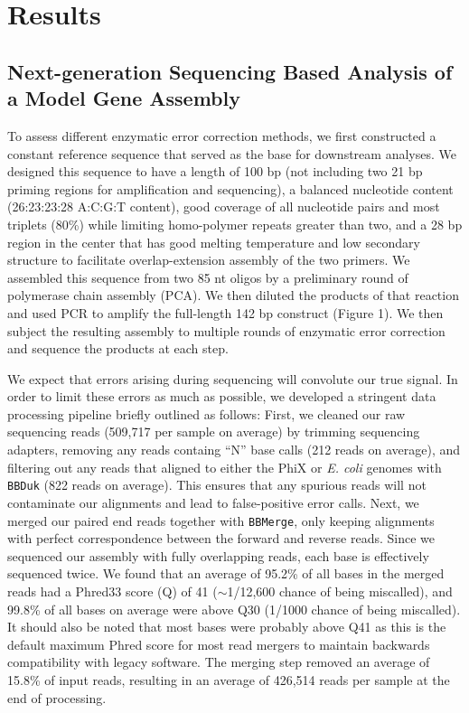 \documentclass[twocolumn]{article}
\begin{document}
%
\section*{Results}
%

\subsection*{Next-generation Sequencing Based Analysis of a Model Gene Assembly}

To assess different enzymatic error correction methods, we first constructed a constant reference sequence that served as the base for downstream analyses. We designed this sequence to have a length of 100 bp (not including two 21 bp priming regions for amplification and sequencing), a balanced nucleotide content (26:23:23:28 A:C:G:T content), good coverage of all nucleotide pairs and most triplets (80\%) while limiting homo-polymer repeats greater than two, and a 28 bp region in the center that has good melting temperature and low secondary structure to facilitate overlap-extension assembly of the two primers. We assembled this sequence from two 85 nt oligos by a preliminary round of polymerase chain assembly (PCA). We then diluted the products of that reaction and used PCR to amplify the full-length 142 bp construct (Figure 1). We then subject the resulting assembly to multiple rounds of enzymatic error correction and sequence the products at each step.

We expect that errors arising during sequencing will convolute our true signal. In order to limit these errors as much as possible, we developed a stringent data processing pipeline briefly outlined as follows: First, we cleaned our raw sequencing reads (509,717 per sample on average) by trimming sequencing adapters, removing any reads containg ``N'' base calls (212 reads on average), and filtering out any reads that aligned to either the PhiX or \textit{E. coli} genomes with \texttt{BBDuk} (822 reads on average). This ensures that any spurious reads will not contaminate our alignments and lead to false-positive error calls. Next, we merged our paired end reads together with \texttt{BBMerge}, only keeping alignments with perfect correspondence between the forward and reverse reads. Since we sequenced our assembly with fully overlapping reads, each base is effectively sequenced twice. We found that an average of 95.2\% of all bases in the merged reads had a Phred33 score (Q) of 41 ($\sim$1/12,600 chance of being miscalled), and 99.8\% of all bases on average were above Q30 (1/1000 chance of being miscalled). It should also be noted that most bases were probably above Q41 as this is the default maximum Phred score for most read mergers to maintain backwards compatibility with legacy software. The merging step removed an average of 15.8\% of input reads, resulting in an average of 426,514 reads per sample at the end of processing.
\end{document}
